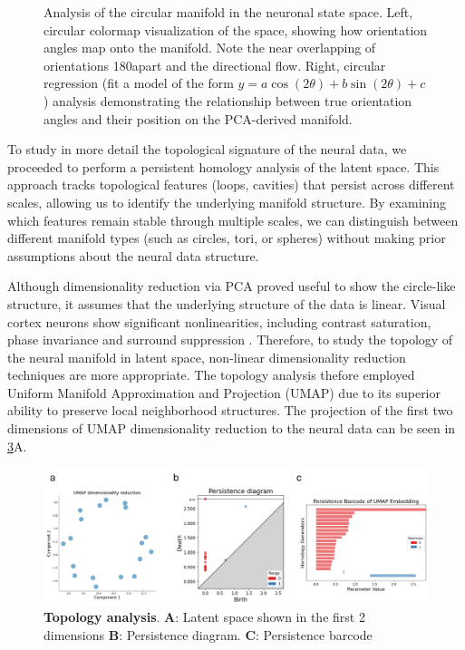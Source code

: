\documentclass[11pt,a4paper]{article}
\begin{document}
\begin{figure}[h!]
\begin{subfigure}[b]{0.48\textwidth}
        \label{fig:mouse_regression}
    \end{subfigure}
        \caption{Analysis of the circular manifold in the neuronal state space. Left, circular colormap visualization of the space, showing how orientation angles map onto the manifold. Note the near overlapping of orientations 180\textdegree apart and the directional flow. Right, circular regression (fit   a model of the form $y = a\cos(2\theta) + b\sin(2\theta) + c$) analysis demonstrating the relationship between true orientation angles and their position on the PCA-derived manifold.}
    \label{fig:mouse_manifold_analysis}
\end{figure}

To study in more detail the topological signature of the neural data, we proceeded to perform a persistent homology analysis of the latent space. This approach tracks topological features (loops, cavities) that persist across different scales, allowing us to identify the underlying manifold structure. By examining which features remain stable through multiple scales, we can distinguish between different manifold types (such as circles, tori, or spheres) without making prior assumptions about the neural data structure.

Although dimensionality reduction via PCA proved useful to show the circle-like structure, it assumes that the underlying structure of the data is linear. Visual cortex neurons show significant nonlinearities, including contrast saturation, phase invariance and surround suppression \cite{david2004natural}. Therefore, to study the topology of the neural manifold in latent space, non-linear dimensionality reduction techniques are more appropriate. The topology analysis thefore employed Uniform Manifold Approximation and Projection (UMAP) due to its superior ability to preserve local neighborhood structures. The projection of the first two dimensions of UMAP dimensionality reduction to the neural data can be seen in \ref{fig:topology.jpg}A.

\begin{figure}[h!]
    \centering
    \includegraphics[width=\linewidth]{results/topolgy.jpg}
    \caption{\textbf{Topology analysis}. \textbf{A}: Latent space shown in the first 2 dimensions \textbf{B}: Persistence diagram. \textbf{C}: Persistence barcode} 
    \label{fig:topology.jpg}
\end{figure}
\end{document}
